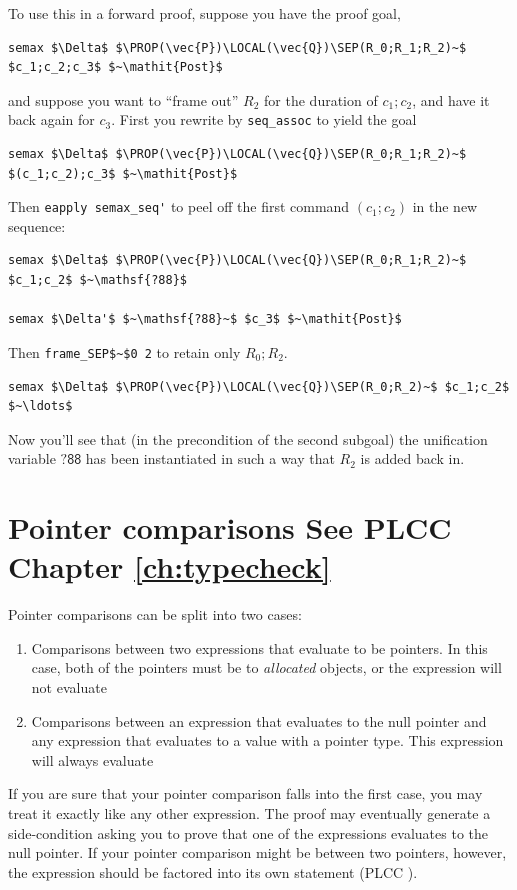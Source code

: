 \documentclass[12pt,fleqn,openany,oneside,showtrims]{memoir}
\newcommand{\ychapter}[2]{\chapter[#1]{#1 \hfill \normalsize #2}}
\begin{document}
To use this in a forward proof, suppose you have the
proof goal,
\begin{lstlisting}
semax $\Delta$ $\PROP(\vec{P})\LOCAL(\vec{Q})\SEP(R_0;R_1;R_2)~$ $c_1;c_2;c_3$ $~\mathit{Post}$
\end{lstlisting}
and suppose you want to ``frame out'' $R_2$ for the duration of
$c_1;c_2$, and have it back again for $c_3$.
First you rewrite by \lstinline{seq_assoc}
to yield the goal
\begin{lstlisting}
semax $\Delta$ $\PROP(\vec{P})\LOCAL(\vec{Q})\SEP(R_0;R_1;R_2)~$ $(c_1;c_2);c_3$ $~\mathit{Post}$
\end{lstlisting}
Then \lstinline{eapply semax_seq'} to peel off the
first command $(c_1;c_2)$ in the new sequence:
\begin{lstlisting}
semax $\Delta$ $\PROP(\vec{P})\LOCAL(\vec{Q})\SEP(R_0;R_1;R_2)~$ $c_1;c_2$ $~\mathsf{?88}$

semax $\Delta'$ $~\mathsf{?88}~$ $c_3$ $~\mathit{Post}$
\end{lstlisting}
Then \lstinline{frame_SEP$~$0 2} to retain only $R_0;R_2$.
\begin{lstlisting}
semax $\Delta$ $\PROP(\vec{P})\LOCAL(\vec{Q})\SEP(R_0;R_2)~$ $c_1;c_2$ $~\ldots$
\end{lstlisting}
Now you'll see that (in the precondition of the second subgoal)
the unification variable $\mathsf{?88}$ has been
instantiated in such a way that $R_2$ is added back in.

\ychapter{Pointer comparisons}{See PLCC Chapter \ref{ch:typecheck}}
\label{refcard:pointer-cmp}
Pointer comparisons can be split into two cases:
\begin{enumerate}
  \item Comparisons between two expressions that evaluate to be pointers. In
  this case, both of the pointers must be to \emph{allocated} objects, or the
  expression will not evaluate
  \item Comparisons between an expression that evaluates to the null pointer and
  any expression that evaluates to a value with a pointer type. This expression
  will always evaluate
\end{enumerate}

If you are sure that your pointer comparison falls into the first case, you may
treat it exactly like any other expression. The proof may eventually generate a
side-condition asking you to prove that one of the expressions evaluates to the
null pointer. If your pointer comparison might be between two pointers, however,
the expression should be factored into its own statement (PLCC
).
\end{document}
